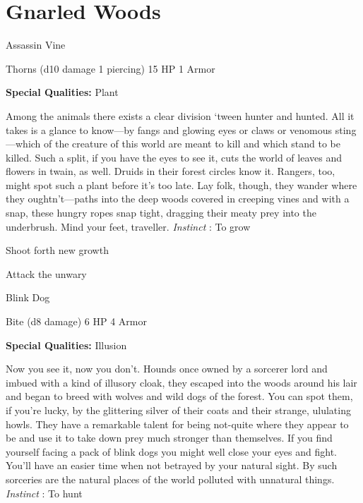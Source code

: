 \chapter{Gnarled Woods}
   
 


\startMonsterName
Assassin Vine	 
\stopMonsterName
 

Thorns (d10 damage 1 piercing)	15 HP	1 Armor

 


 
\startMonsterQualities
{\bf Special Qualities:}  Plant
\stopMonsterQualities
 
\startMonsterDescription
Among the animals there exists a clear division ‘tween hunter and hunted. All it takes is a glance to know—by fangs and glowing eyes or claws or venomous sting—which of the creature of this world are meant to kill and which stand to be killed. Such a split, if you have the eyes to see it, cuts the world of leaves and flowers in twain, as well. Druids in their forest circles know it. Rangers, too, might spot such a plant before it’s too late. Lay folk, though, they wander where they oughtn’t—paths into the deep woods covered in creeping vines and with a snap, these hungry ropes snap tight, dragging their meaty prey into the underbrush. Mind your feet, traveller. {\em Instinct} : To grow
\stopMonsterDescription
 
\startitemize[1,packed]

\item Shoot forth new growth

 
\item Attack the unwary


\stopitemize
 
\startMonsterName
Blink Dog	 
\stopMonsterName
 

Bite (d8 damage)	6 HP	4 Armor

 


 
\startMonsterQualities
{\bf Special Qualities:}  Illusion
\stopMonsterQualities
 
\startMonsterDescription
Now you see it, now you don’t. Hounds once owned by a sorcerer lord and imbued with a kind of illusory cloak, they escaped into the woods around his lair and began to breed with wolves and wild dogs of the forest. You can spot them, if you’re lucky, by the glittering silver of their coats and their strange, ululating howls. They have a remarkable talent for being not-quite where they appear to be and use it to take down prey much stronger than themselves. If you find yourself facing a pack of blink dogs you might well close your eyes and fight. You’ll have an easier time when not betrayed by your natural sight. By such sorceries are the natural places of the world polluted with unnatural things. {\em Instinct} : To hunt
\stopMonsterDescription
 
